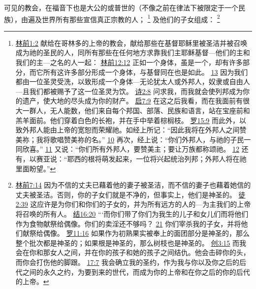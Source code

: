 \documentclass[12pt, a4paper, oneside]{ctexart}
\newcounter{parnum}[section]
\newcommand{\N}{%
   \noindent\refstepcounter{parnum}%
    \makebox[\parindent][l]{\textbf{\arabic{parnum}.}}}
\begin{document}
\N 可见的教会，在福音下也是大公的或普世的（不像之前在律法下被限定于一个民族），由遍及世界所有那些宣信真正宗教的人；
	\footnote {
		\href{https://biblehub.com/1_corinthians/1-2.htm}{林前1:2} 献给在哥林多的上帝的教会，献给那些在基督耶稣里被圣洁并被召唤成为祂的圣民的人，同所有那些在任何地方求靠我们主耶稣基督---他们的主和我们的主---之名的人一起：
		\href{https://biblehub.com/1_corinthians/12-12.htm}{林前12:12} 正如一个身体，虽是一个，却有许多部分，而它所有这许多部分形成一个身体，与基督同在也是如此。
		\href{https://biblehub.com/1_corinthians/12-13.htm}{13} 因为我们都由一位圣灵受洗，以致形成一个身体---无论犹太人或外邦人，奴隶或自由人---且我们都被赐予了这一位圣灵为饮。
		\href{https://biblehub.com/psalms/2-8.htm}{诗2:8} 问求我，而我就会使列邦成为你的遗产，使大地的尽头成为你的财产。
		\href{https://biblehub.com/revelation/7-9.htm}{启7:9} 在这之后我看，而在我面前有很大一群人，无人能数，他们来自每个邦国、部落、民族和语言，站在宝座前和羔羊面前。他们穿着白色的长袍，并在手中举着棕榈枝。
		\href{https://biblehub.com/romans/15-9.htm}{罗15:9} 而此外，以致外邦人能由上帝的宽恕而荣耀祂。如经上所记：“因此我将在外邦人之间赞美祢；我将歌唱赞美祢的名。”
		\href{https://biblehub.com/romans/15-10.htm}{10} 再次，经上说：“你们外邦人，与祂的子民一同欣喜。”
		\href{https://biblehub.com/romans/15-11.htm}{11} 又说：“你们所有外邦人，要赞美主；要让万族都称颂祂。
		\href{https://biblehub.com/romans/15-12.htm}{12} 还有，以赛亚说：“耶西的根将萌发起来，一位将兴起统治列邦；外邦人将在祂里面盼望。”
	}
	及他们的子女组成：
	\footnote {
		\href{https://biblehub.com/1_corinthians/7-14.htm}{林前7:14} 因为不信的丈夫已藉着他的妻子被圣洁，而不信的妻子也藉着她信的丈夫被圣洁。否则，你的子女们就是不净的，但事实上，他们是神圣的。
		\href{https://biblehub.com/acts/2-39.htm}{徒2:39} 这应许是为你们和你们的子女的，并为所有远方的人的---为主我们的上帝将召唤的所有人。
		\href{https://biblehub.com/ezekiel/16-20.htm}{结16:20} “‘而你们带了你们为我生的儿子和女儿们而将他们作为食物献祭给偶像。你们的卖淫还不够吗？
		\href{https://biblehub.com/ezekiel/16-21.htm}{21} 你们宰杀我的子女，并将他们献祭给偶像。
		\href{https://biblehub.com/romans/11-16.htm}{罗11:16} 如果作为初熟果实被奉上的面团部分是神圣的，那么整个批次都是神圣的；如果根是神圣的，那么树枝也是神圣的。
		\href{https://biblehub.com/genesis/3-15.htm}{创3:15} 而我会在你和那女人之间，并在你的孩子和她的孩子之间结仇。他会击碎你的头，而你会打伤他的脚跟。
		\href{https://biblehub.com/genesis/17-7.htm}{17:7} 我会确立我的圣约，作为我与你以及你之后的后代之间的永久之约，为要到来的世代，而成为你的上帝和在你之后的你的后代的上帝。
	}
\end{document}

